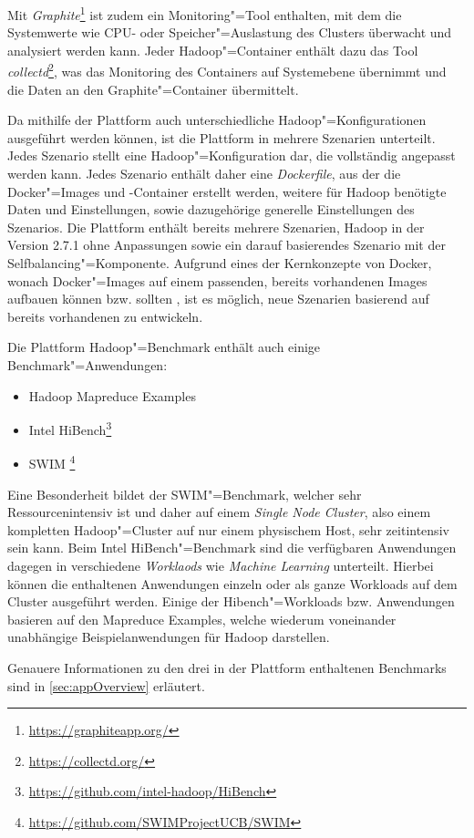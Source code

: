 Mit \emph{Graphite}\footnote{\url{https://graphiteapp.org/}} ist zudem ein Monitoring"=Tool enthalten, mit dem die Systemwerte wie CPU- oder Speicher"=Auslastung des Clusters überwacht und analysiert werden kann.
Jeder Hadoop"=Container enthält dazu das Tool \emph{collectd}\footnote{\url{https://collectd.org/}}, was das Monitoring des Containers auf Systemebene übernimmt und die Daten an den Graphite"=Container übermittelt.

Da mithilfe der Plattform auch unterschiedliche Hadoop"=Konfigurationen ausgeführt werden können, ist die Plattform in mehrere Szenarien unterteilt.
Jedes Szenario stellt eine Hadoop"=Konfiguration dar, die vollständig angepasst werden kann.
Jedes Szenario enthält daher eine \emph{Dockerfile}, aus der die Docker"=Images und -Container erstellt werden, weitere für Hadoop benötigte Daten und Einstellungen, sowie dazugehörige generelle Einstellungen des Szenarios.
Die Plattform enthält bereits mehrere Szenarien, \uA Hadoop in der Version 2.7.1 ohne Anpassungen sowie ein darauf basierendes Szenario mit der Selfbalancing"=Komponente.
Aufgrund eines der Kernkonzepte von Docker, wonach Docker"=Images auf einem passenden, bereits vorhandenen Images aufbauen können bzw. sollten \cite{DockerdevBestPractice}, ist es möglich, neue Szenarien basierend auf bereits vorhandenen zu entwickeln.

Die Plattform Hadoop"=Benchmark enthält auch einige Benchmark"=Anwendungen:

\begin{itemize}
    \item Hadoop Mapreduce Examples
    \item Intel HiBench\footnote{\url{https://github.com/intel-hadoop/HiBench}}
    \item \ac{SWIM} \footnote{\url{https://github.com/SWIMProjectUCB/SWIM}}
\end{itemize}

Eine Besonderheit bildet der SWIM"=Benchmark, welcher sehr Ressourcenintensiv ist und daher auf einem \emph{Single Node Cluster}, also einem kompletten Hadoop"=Cluster auf nur einem physischem Host, sehr zeitintensiv sein kann.
Beim Intel HiBench"=Benchmark sind die verfügbaren Anwendungen dagegen in verschiedene \emph{Worklaods} wie \emph{Machine Learning} unterteilt.
Hierbei können die enthaltenen Anwendungen einzeln oder als ganze Workloads auf dem Cluster ausgeführt werden.
Einige der Hibench"=Workloads bzw. Anwendungen basieren auf den Mapreduce Examples, welche wiederum voneinander unabhängige Beispielanwendungen für Hadoop darstellen.

Genauere Informationen zu den drei in der Plattform enthaltenen Benchmarks sind in \cref{sec:appOverview} erläutert.
